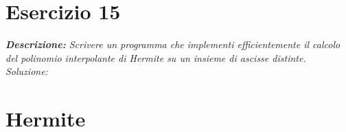 \section{Esercizio 15}
\textit{\textbf{Descrizione:} Scrivere un programma che implementi efficientemente il calcolo del polinomio interpolante di Hermite su un insieme di ascisse distinte.}\newline
\noindent\emph{Soluzione: }\newline

\section*{Hermite}

\newpage
\newpage